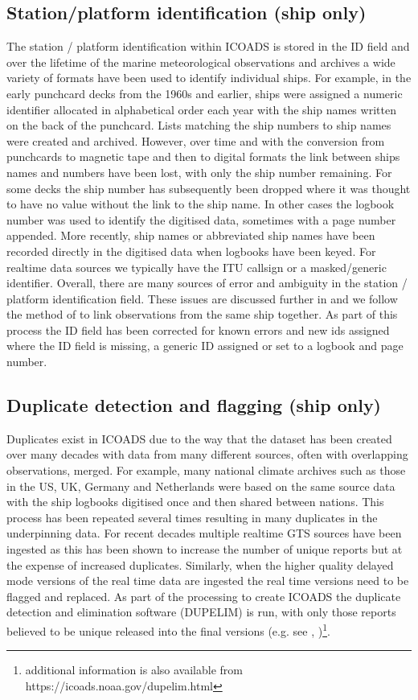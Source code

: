 \FloatBarrier
\subsection{Station/platform identification (ship only)}
The station / platform identification within ICOADS is stored in the ID field and over the lifetime of the marine meteorological observations and archives a wide variety of formats have been used to identify individual ships. 
For example, in the early punchcard decks from the 1960s and earlier, ships were assigned a numeric identifier allocated in alphabetical order each year with the ship names written on the back of the punchcard. Lists matching the ship numbers to ship names were created and archived. 
However, over time and with the conversion from punchcards to magnetic tape and then to digital formats the link between ships names and numbers have been lost, with only the ship number remaining.
For some decks the ship number has subsequently been dropped where it was thought to have no value without the link to the ship name.
In other cases the logbook number was used to identify the digitised data, sometimes with a page number appended.
More recently, ship names or abbreviated ship names have been recorded directly in the digitised data when logbooks have been keyed.
For realtime data sources we typically have the ITU callsign or a masked/generic identifier.
Overall, there are many sources of error and ambiguity in the station / platform identification field.
These issues are discussed further in \cite{Carella2017_tracking} and we follow the method of \cite{Carella2017_tracking} to link observations from the same ship together.
As part of this process the ID field has been corrected for known errors and new ids assigned where the ID field is missing, a generic ID assigned or set to a logbook and page number.
\FloatBarrier
\subsection{Duplicate detection and flagging (ship only)} \label{ship-dupelim}
Duplicates exist in ICOADS due to the way that the dataset has been created over many decades with data from many different sources, often with overlapping observations, merged. 
For example, many national climate archives such as those in the US, UK, Germany and Netherlands were based on the same source data with the ship logbooks digitised once and then shared between nations. 
This process has been repeated several times resulting in many duplicates in the underpinning data. 
For recent decades multiple realtime GTS sources have been ingested as this has been shown to increase the number of unique reports but at the expense of increased duplicates. 
Similarly, when the higher quality delayed mode versions of the real time data are ingested the real time versions need to be flagged and replaced. 
As part of the processing to create ICOADS the duplicate detection and elimination software (DUPELIM) is run, with only those reports believed to be unique released into the final versions (e.g. see \cite{Freeman2017}, \cite{Woodruff2011})\footnote{additional information is also available from https://icoads.noaa.gov/dupelim.html}.

